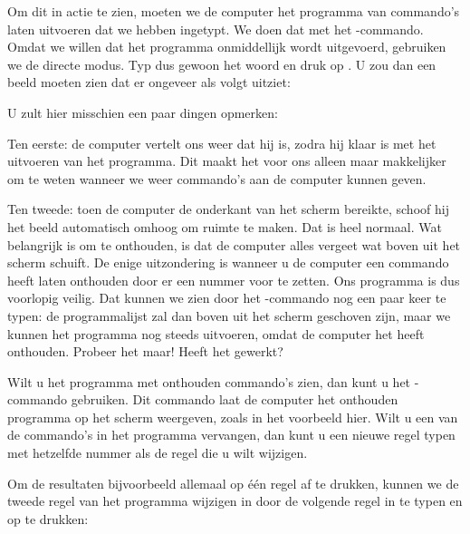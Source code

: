 \needspace{4cm} %
Om dit in actie te zien, moeten we de computer het programma van commando's laten uitvoeren dat we hebben ingetypt. We doen dat met het -commando. Omdat we willen dat het programma onmiddellijk wordt uitgevoerd, gebruiken we de directe modus. Typ dus gewoon het woord  en druk op . U zou dan een beeld moeten zien dat er ongeveer als volgt uitziet:


U zult hier misschien een paar dingen opmerken:

Ten eerste: de computer vertelt ons weer dat hij  is, zodra hij klaar is met het uitvoeren van het programma. Dit maakt het voor ons alleen maar makkelijker om te weten wanneer we weer commando's aan de computer kunnen geven.

Ten tweede: toen de computer de onderkant van het scherm bereikte, schoof hij het beeld automatisch omhoog om ruimte te maken. Dat is heel normaal. Wat belangrijk is om te onthouden, is dat de computer alles vergeet wat boven uit het scherm schuift. De enige uitzondering is wanneer u de computer een commando heeft laten onthouden door er een nummer voor te zetten. Ons programma is dus voorlopig veilig. Dat kunnen we zien door het -commando nog een paar keer te typen: de programmalijst zal dan boven uit het scherm geschoven zijn, maar we kunnen het programma nog steeds uitvoeren, omdat de computer het heeft onthouden. Probeer het maar! Heeft het gewerkt?

\needspace{4cm} %
Wilt u het programma met onthouden commando's zien, dan kunt u het -commando gebruiken. Dit commando laat de computer het onthouden programma op het scherm weergeven, zoals in het voorbeeld hier. Wilt u een van de commando's in het programma vervangen, dan kunt u een nieuwe regel typen met hetzelfde nummer als de regel die u wilt wijzigen.


\needspace{4cm} %
Om de resultaten bijvoorbeeld allemaal op één regel af te drukken, kunnen we de tweede regel van het programma wijzigen in  door de volgende regel in te typen en op  te drukken:



